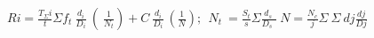 \(Ri=\frac{T_{\Sigma}i}{t}\Sigma f_t\ \frac{d_i}{D_i}\ \left(\ \frac{1}{N_t}\right)+C\ \frac{d_i}{D_i}\ \left(\frac{1}{N}\right);\ \ N_t\ =\frac{S_t}{s}\Sigma\frac{d_s\ }{D_s\ \ }\ N=\frac{N_c}{j}\Sigma\ \Sigma\ dj\frac{dj}{Dj}\)
